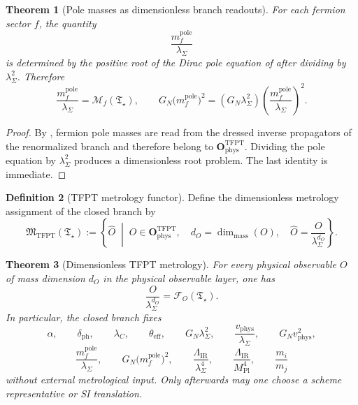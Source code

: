 \documentclass[11pt,a4paper]{article}
\newtheorem{theorem}{Theorem}[section]
\theoremstyle{definition}
\newtheorem{definition}[theorem]{Definition}
\theoremstyle{remark}
\newcommand{\Mplunred}{M_{\mathrm{Pl}}}
\newcommand{\Tstar}{\mathfrak T_{\star}}
\newcommand{\OphysTFPT}{\mathbf O_{\mathrm{phys}}^{\mathrm{TFPT}}}
\begin{document}
\begin{theorem}[Pole masses as dimensionless branch readouts]
\label{thm:dimensionless-pole-mass-readout}
For each fermion sector $f$, the quantity
\[
\frac{m_f^{\mathrm{pole}}}{\lambda_\Sigma}
\]
is determined by the positive root of the Dirac pole equation of
 after dividing by $\lambda_\Sigma^2$. Therefore
\[
\frac{m_f^{\mathrm{pole}}}{\lambda_\Sigma}
=
\mathcal M_f(\Tstar),
\qquad
G_N\bigl(m_f^{\mathrm{pole}}\bigr)^2
=
(G_N\lambda_\Sigma^2)\left(\frac{m_f^{\mathrm{pole}}}{\lambda_\Sigma}\right)^2.
\]
\end{theorem}

\begin{proof}
By , fermion pole masses are read from the dressed inverse propagators
of the renormalized branch and therefore belong to $\OphysTFPT$. Dividing the pole equation by
$\lambda_\Sigma^2$ produces a dimensionless root problem. The last identity is immediate.
\end{proof}

\begin{definition}[TFPT metrology functor]
\label{def:tfpt-metrology-functor}
Define the dimensionless metrology assignment of the closed branch by
\[
\mathfrak M_{\mathrm{TFPT}}(\Tstar)
:=
\left\{
\widehat O \;\middle|\;
O\in\OphysTFPT,\quad
d_O=\dim_{\mathrm{mass}}(O),\quad
\widehat O=\frac{O}{\lambda_\Sigma^{d_O}}
\right\}.
\]
\end{definition}

\begin{theorem}[Dimensionless TFPT metrology]
\label{thm:dimensionless-tfpt-metrology}
For every physical observable $O$ of mass dimension $d_O$ in the physical observable layer, one has
\[
\frac{O}{\lambda_\Sigma^{d_O}}
=
\mathcal F_O(\Tstar).
\]
In particular, the closed branch fixes
\[
\alpha,
\qquad
\delta_{\mathrm{ph}},
\qquad
\lambda_C,
\qquad
\theta_{\mathrm{eff}},
\qquad
G_N\lambda_\Sigma^2,
\qquad
\frac{v_{\mathrm{phys}}}{\lambda_\Sigma},
\qquad
G_Nv_{\mathrm{phys}}^2,
\]
\[
\frac{m_f^{\mathrm{pole}}}{\lambda_\Sigma},
\qquad
G_N\bigl(m_f^{\mathrm{pole}}\bigr)^2,
\qquad
\frac{\Lambda_{\mathrm{IR}}}{\lambda_\Sigma^4},
\qquad
\frac{\Lambda_{\mathrm{IR}}}{\Mplunred^4},
\qquad
\frac{m_i}{m_j}
\]
without external metrological input. Only afterwards may one choose a scheme representative or SI
translation.
\end{theorem}
\end{document}
